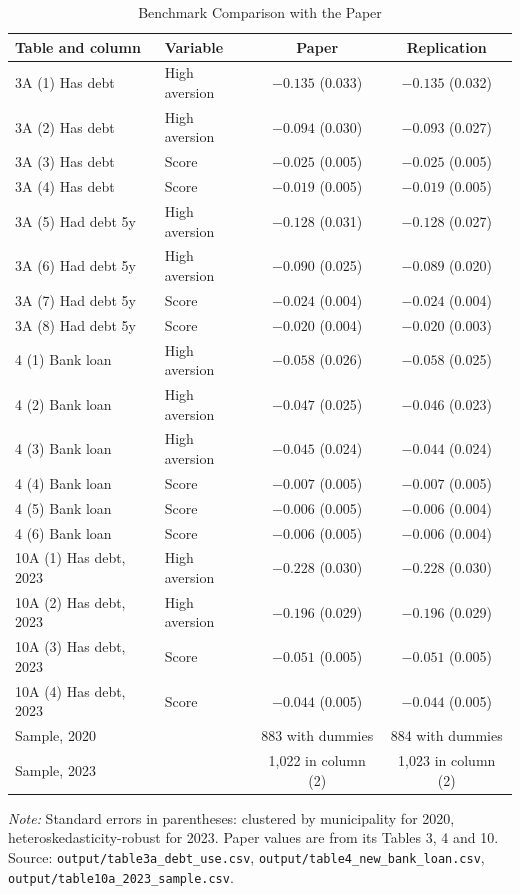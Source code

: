 \documentclass[preprint,letterpaper,11pt,authoryear]{elsarticle}
\newenvironment{tablenotes}{\par\vspace{3pt}\begin{minipage}{0.95\linewidth}\footnotesize\textit{Note:} }{\end{minipage}}
\begin{document}
\begin{table}[!htbp]
\centering\small\setlength{\tabcolsep}{4pt}
\caption{Benchmark Comparison with the Paper}
\label{tab:benchmark}
\begin{tabular}{llcc}
\toprule
Table and column & Variable & Paper & Replication \\
\midrule
3A (1) Has debt & High aversion & $-0.135$ (0.033) & $-0.135$ (0.032) \\
3A (2) Has debt & High aversion & $-0.094$ (0.030) & $-0.093$ (0.027) \\
3A (3) Has debt & Score & $-0.025$ (0.005) & $-0.025$ (0.005) \\
3A (4) Has debt & Score & $-0.019$ (0.005) & $-0.019$ (0.005) \\
3A (5) Had debt 5y & High aversion & $-0.128$ (0.031) & $-0.128$ (0.027) \\
3A (6) Had debt 5y & High aversion & $-0.090$ (0.025) & $-0.089$ (0.020) \\
3A (7) Had debt 5y & Score & $-0.024$ (0.004) & $-0.024$ (0.004) \\
3A (8) Had debt 5y & Score & $-0.020$ (0.004) & $-0.020$ (0.003) \\
4 (1) Bank loan & High aversion & $-0.058$ (0.026) & $-0.058$ (0.025) \\
4 (2) Bank loan & High aversion & $-0.047$ (0.025) & $-0.046$ (0.023) \\
4 (3) Bank loan & High aversion & $-0.045$ (0.024) & $-0.044$ (0.024) \\
4 (4) Bank loan & Score & $-0.007$ (0.005) & $-0.007$ (0.005) \\
4 (5) Bank loan & Score & $-0.006$ (0.005) & $-0.006$ (0.004) \\
4 (6) Bank loan & Score & $-0.006$ (0.005) & $-0.006$ (0.004) \\
10A (1) Has debt, 2023 & High aversion & $-0.228$ (0.030) & $-0.228$ (0.030) \\
10A (2) Has debt, 2023 & High aversion & $-0.196$ (0.029) & $-0.196$ (0.029) \\
10A (3) Has debt, 2023 & Score & $-0.051$ (0.005) & $-0.051$ (0.005) \\
10A (4) Has debt, 2023 & Score & $-0.044$ (0.005) & $-0.044$ (0.005) \\
\midrule
Sample, 2020 & & 883 with dummies & 884 with dummies \\
Sample, 2023 & & 1,022 in column (2) & 1,023 in column (2) \\
\bottomrule
\end{tabular}
\begin{tablenotes}
Standard errors in parentheses: clustered by municipality for 2020, heteroskedasticity-robust for 2023. Paper values are from its Tables 3, 4 and 10. Source: \texttt{output/table3a\_debt\_use.csv}, \texttt{output/table4\_new\_bank\_loan.csv}, \texttt{output/table10a\_2023\_sample.csv}.
\end{tablenotes}
\end{table}
\end{document}
